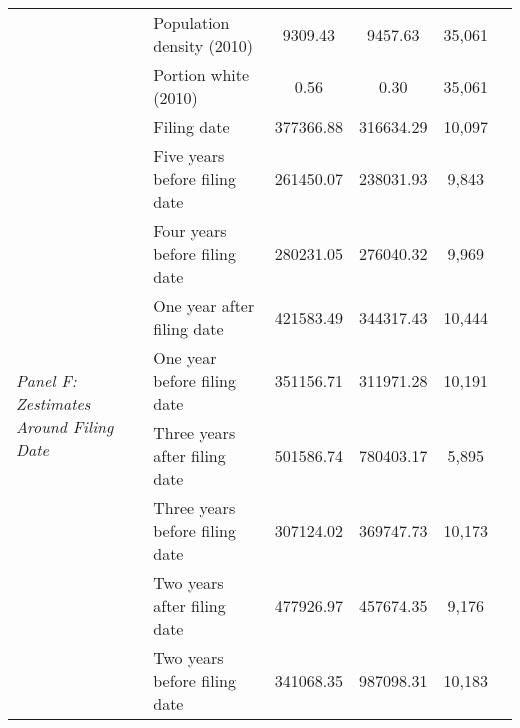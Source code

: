 \begin{tabular}{llcccc}
 & Population density (2010) & 9309.43 & 9457.63 & 35,061 \\
 & Portion white (2010) & 0.56 & 0.30 & 35,061 \\
\cline{1-5}
\multirow[c]{9}{4cm}{\textit{Panel F: Zestimates Around Filing Date}} & Filing date & 377366.88 & 316634.29 & 10,097 \\
 & Five years before filing date & 261450.07 & 238031.93 & 9,843 \\
 & Four years before filing date & 280231.05 & 276040.32 & 9,969 \\
 & One year after filing date & 421583.49 & 344317.43 & 10,444 \\
 & One year before filing date & 351156.71 & 311971.28 & 10,191 \\
 & Three years after filing date & 501586.74 & 780403.17 & 5,895 \\
 & Three years before filing date & 307124.02 & 369747.73 & 10,173 \\
 & Two years after filing date & 477926.97 & 457674.35 & 9,176 \\
 & Two years before filing date & 341068.35 & 987098.31 & 10,183 \\
\cline{1-5}
\bottomrule
\end{tabular}
